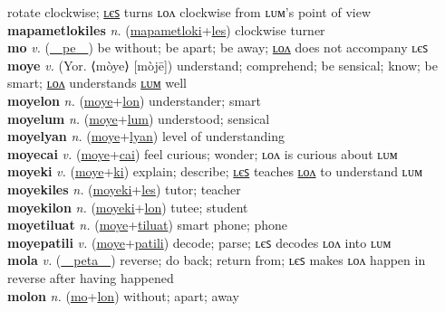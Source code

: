 rotate clockwise; \hyperref[mapametlokiles]{ʟєꜱ} turns ʟᴏᴧ clockwise from ʟᴜᴍ’s point of view \label{mapametloki} \\
\textbf{mapametlokiles} \textit{n.} (\hyperref[mapametloki]{mapametloki}+\hyperref[les]{les})
clockwise turner \label{mapametlokiles} \\
\textbf{mo} \textit{v.} (\hyperref[pe]{~~pe~~})
be without; be apart; be away; \hyperref[molon]{ʟᴏᴧ} does not accompany ʟєꜱ \label{mo} \\
\textbf{moye} \textit{v.} (Yor. ⟨mòye⟩ [mòjē])
understand; comprehend; be sensical; know; be smart; \hyperref[moyelon]{ʟᴏᴧ} understands \hyperref[moyelum]{ʟᴜᴍ} well \label{moye} \\
\textbf{moyelon} \textit{n.} (\hyperref[moye]{moye}+\hyperref[lon]{lon})
understander; smart \label{moyelon} \\
\textbf{moyelum} \textit{n.} (\hyperref[moye]{moye}+\hyperref[lum]{lum})
understood; sensical \label{moyelum} \\
\textbf{moyelyan} \textit{n.} (\hyperref[moye]{moye}+\hyperref[lyan]{lyan})
level of understanding \label{moyelyan} \\
\textbf{moyecai} \textit{v.} (\hyperref[moye]{moye}+\hyperref[cai]{cai})
feel curious; wonder; ʟᴏᴧ is curious about ʟᴜᴍ \label{moyecai} \\
\textbf{moyeki} \textit{v.} (\hyperref[moye]{moye}+\hyperref[ki]{ki})
explain; describe; \hyperref[moyekiles]{ʟєꜱ} teaches \hyperref[moyekilon]{ʟᴏᴧ} to understand ʟᴜᴍ \label{moyeki} \\
\textbf{moyekiles} \textit{n.} (\hyperref[moyeki]{moyeki}+\hyperref[les]{les})
tutor; teacher \label{moyekiles} \\
\textbf{moyekilon} \textit{n.} (\hyperref[moyeki]{moyeki}+\hyperref[lon]{lon})
tutee; student \label{moyekilon} \\
\textbf{moyetiluat} \textit{n.} (\hyperref[moye]{moye}+\hyperref[tiluat]{tiluat})
smart phone; phone \label{moyetiluat} \\
\textbf{moyepatili} \textit{v.} (\hyperref[moye]{moye}+\hyperref[patili]{patili})
decode; parse; ʟєꜱ decodes ʟᴏᴧ into ʟᴜᴍ \label{moyepatili} \\
\textbf{mola} \textit{v.} (\hyperref[peta]{~~peta~~})
reverse; do back; return from; ʟєꜱ makes ʟᴏᴧ happen in reverse after having happened \label{mola} \\
\textbf{molon} \textit{n.} (\hyperref[mo]{mo}+\hyperref[lon]{lon})
without; apart; away \label{molon} \\
